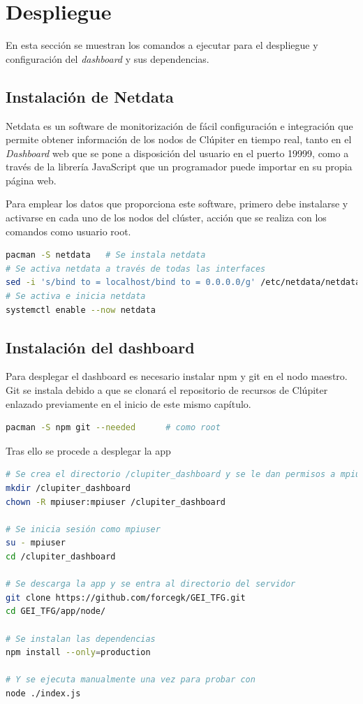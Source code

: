 \section{Despliegue}
En esta sección se muestran los comandos a ejecutar para el despliegue y configuración del \textit{dashboard} y sus dependencias.

\subsection{Instalación de Netdata}
Netdata es un software de monitorización de fácil configuración e integración que permite obtener información de los nodos de Clúpiter en tiempo real, tanto en el \textit{Dashboard} web que se pone a disposición del usuario en el puerto 19999, como a través de la librería JavaScript que un programador puede importar en su propia página web.

Para emplear los datos que proporciona este software, primero debe instalarse y activarse en cada uno de los nodos del clúster, acción que se realiza con los comandos como usuario root.

\begin{lstlisting}[language=bash]
pacman -S netdata   # Se instala netdata
# Se activa netdata a través de todas las interfaces
sed -i 's/bind to = localhost/bind to = 0.0.0.0/g' /etc/netdata/netdata.conf
# Se activa e inicia netdata
systemctl enable --now netdata
\end{lstlisting}

\subsection{Instalación del dashboard}
Para desplegar el dashboard es necesario instalar npm y git en el nodo maestro. Git se instala debido a que se clonará el repositorio de recursos de Clúpiter enlazado previamente en el inicio de este mismo capítulo.
\begin{lstlisting}[language=bash]
pacman -S npm git --needed      # como root
\end{lstlisting}

Tras ello se procede a desplegar la app
\begin{lstlisting}[language=bash]
# Se crea el directorio /clupiter_dashboard y se le dan permisos a mpiuser
mkdir /clupiter_dashboard
chown -R mpiuser:mpiuser /clupiter_dashboard

# Se inicia sesión como mpiuser
su - mpiuser
cd /clupiter_dashboard

# Se descarga la app y se entra al directorio del servidor
git clone https://github.com/forcegk/GEI_TFG.git
cd GEI_TFG/app/node/

# Se instalan las dependencias
npm install --only=production

# Y se ejecuta manualmente una vez para probar con
node ./index.js
\end{lstlisting}

